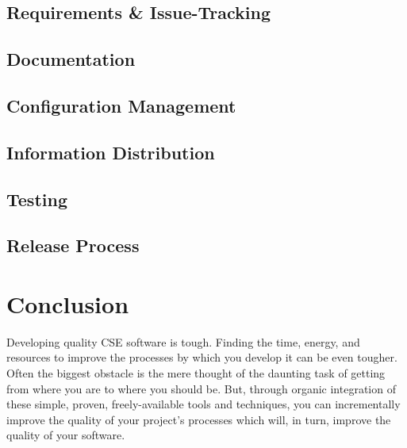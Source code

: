 \documentclass[12pt,relax]{article}
\begin{document}
\subsection{Requirements \& Issue-Tracking}


\subsection{Documentation}


\subsection{Configuration Management}


\subsection{Information Distribution}


\subsection{Testing}


\subsection{Release Process}


\clearpage


\section{Conclusion}
\label{Section:Conclusion}

Developing quality CSE software is tough.  Finding the time, energy, and
resources to improve the processes by which you develop it can be even tougher.
Often the biggest obstacle is the mere thought of the daunting task of getting
from where you are to where you should be.  But, through organic integration of
these simple, proven, freely-available tools and techniques, you can
incrementally improve the quality of your project's processes which will, in
turn, improve the quality of your software.
\end{document}
